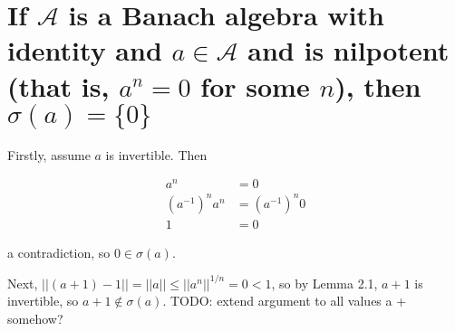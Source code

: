 \documentclass{article}
\begin{document}
\section{If $\mathscr{A}$ is a Banach algebra with identity and $a \in \mathscr{A}$ and is nilpotent (that is, $a^n=0$ for some $n$), then $\sigma(a) = \{0\}$}

Firstly, assume $a$ is invertible. Then 

\begin{align*}
    a^n &= 0 \\
    (a^{-1})^n a^n &= (a^{-1})^n 0 \\
    1 &= 0
\end{align*}

a contradiction, so $0 \in \sigma(a)$.

Next, $|| (a+1) - 1 || = || a || \le || a^n || ^{1/n} = 0 < 1$, so by Lemma 2.1, $a+1$ is invertible, so $a+1 \not \in \sigma(a)$. TODO: extend argument to all values a + somehow?
\end{document}
